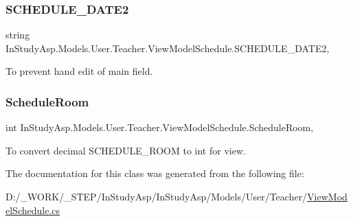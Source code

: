 \subsubsection{\texorpdfstring{S\+C\+H\+E\+D\+U\+L\+E\+\_\+\+D\+A\+T\+E2}{SCHEDULE\_DATE2}}
{\footnotesize\ttfamily string In\+Study\+Asp.\+Models.\+User.\+Teacher.\+View\+Model\+Schedule.\+S\+C\+H\+E\+D\+U\+L\+E\+\_\+\+D\+A\+T\+E2\hspace{0.3cm}{\ttfamily [get]}, {\ttfamily [set]}}



To prevent hand edit of main field. 

\mbox{\label{class_in_study_asp_1_1_models_1_1_user_1_1_teacher_1_1_view_model_schedule_a8de805afbeab5943816641787f787071}} 
\subsubsection{\texorpdfstring{Schedule\+Room}{ScheduleRoom}}
{\footnotesize\ttfamily int In\+Study\+Asp.\+Models.\+User.\+Teacher.\+View\+Model\+Schedule.\+Schedule\+Room\hspace{0.3cm}{\ttfamily [get]}, {\ttfamily [set]}}



To convert decimal S\+C\+H\+E\+D\+U\+L\+E\+\_\+\+R\+O\+OM to int for view. 



The documentation for this class was generated from the following file\+:\begin{DoxyCompactItemize}
\item 
D\+:/\+\_\+\+W\+O\+R\+K/\+\_\+\+S\+T\+E\+P/\+In\+Study\+Asp/\+In\+Study\+Asp/\+Models/\+User/\+Teacher/\hyperlink{_view_model_schedule_8cs}{View\+Model\+Schedule.\+cs}\end{DoxyCompactItemize}
